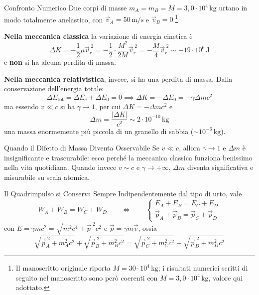 \begin{esempio}{Confronto Numerico}
Due corpi di masse $m_A = m_B = M = 3{,}0 \cdot 10^4 \, \mathrm{kg}$ urtano in modo totalmente anelastico, con $\vec{v}_A = 50 \, \mathrm{m/s}$ e $\vec{v}_B = 0$.\footnote{Il manoscritto originale riporta $M = 30 \cdot 10^4 \, \mathrm{kg}$; i risultati numerici scritti di seguito nel manoscritto sono però coerenti con $M = 3{,}0 \cdot 10^4 \, \mathrm{kg}$, valore qui adottato.}

\textbf{Nella meccanica classica} la variazione di energia cinetica è
\begin{equation*}
    \Delta K = -\frac{1}{2}\mu \vec{v}_r^{\;2} = -\frac{1}{2}\cdot\frac{M^2}{2M}\vec{v}_r^{\;2}
    = -\frac{M}{4}\vec{v}_r^{\;2} \sim -19 \cdot 10^6 \, \mathrm{J}
\end{equation*}
e \textbf{non} si ha alcuna perdita di massa.

\textbf{Nella meccanica relativistica}, invece, si ha una perdita di massa. Dalla conservazione dell'energia totale:
\begin{equation*}
    \Delta E_{\text{tot}} = \Delta E_c + \Delta E_0 = 0
    \implies \Delta K = -\Delta E_0 = -\gamma \Delta m c^2
\end{equation*}
ma essendo $v \ll c$ si ha $\gamma \to 1$, per cui $\Delta K = -\Delta m c^2$ e
\begin{equation*}
    \Delta m = \frac{|\Delta K|}{c^2} \sim 2 \cdot 10^{-10} \, \mathrm{kg}
\end{equation*}
una massa enormemente più piccola di un granello di sabbia ($\sim 10^{-6} \, \mathrm{kg}$).
\end{esempio}

\begin{osservazione}{Quando il Difetto di Massa Diventa Osservabile}
Se $v \ll c$, allora $\gamma \to 1$ e $\Delta m$ è insignificante e trascurabile: ecco perché la meccanica classica funziona benissimo nella vita quotidiana. Quando invece $v \sim c$ e $\gamma \to +\infty$, $\Delta m$ diventa significativa e misurabile su scala atomica.
\end{osservazione}

\begin{teorema}{Il Quadrimpulso si Conserva Sempre}
Indipendentemente dal tipo di urto, vale
\begin{equation}
    W_A + W_B = W_C + W_D
    \qquad \Longleftrightarrow \qquad
    \begin{cases}
        E_A + E_B = E_C + E_D \\
        \vec{p}_A + \vec{p}_B = \vec{p}_C + \vec{p}_D
    \end{cases}
\end{equation}
con $E = \gamma mc^2 = \sqrt{m^2c^4 + \vec{p}^{\;2}c^2}$ e $\vec{p} = \gamma m \vec{v}$, ossia
\begin{equation}
    \sqrt{\vec{p}_A^{\;2} + m_A^2c^2} + \sqrt{\vec{p}_B^{\;2} + m_B^2c^2}
    = \sqrt{\vec{p}_C^{\;2} + m_C^2c^2} + \sqrt{\vec{p}_D^{\;2} + m_D^2c^2}
\end{equation}
\end{teorema}

